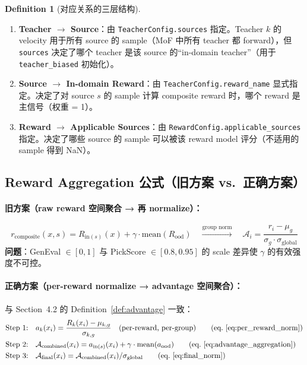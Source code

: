 \documentclass[11pt,a4paper]{article}
\theoremstyle{definition}
\newtheorem{definition}{Definition}
\begin{document}
\begin{definition}[对应关系的三层结构]
\begin{enumerate}[leftmargin=1.5em]
\item \textbf{Teacher $\to$ Source}：由 \texttt{TeacherConfig.sources} 指定。Teacher $k$ 的 velocity 用于所有 source 的 sample（MoF 中所有 teacher 都 forward），但 \texttt{sources} 决定了哪个 teacher 是该 source 的``in-domain teacher''（用于 \texttt{teacher\_biased} 初始化）。

\item \textbf{Source $\to$ In-domain Reward}：由 \texttt{TeacherConfig.reward\_name} 显式指定。决定了对 source $s$ 的 sample 计算 composite reward 时，哪个 reward 是主信号（权重 = 1）。

\item \textbf{Reward $\to$ Applicable Sources}：由 \texttt{RewardConfig.applicable\_sources} 指定。决定了哪些 source 的 sample 可以被该 reward model 评分（不适用的 sample 得到 NaN）。
\end{enumerate}
\end{definition}

\subsection{Reward Aggregation 公式（旧方案 vs.\ 正确方案）}

\paragraph{旧方案（raw reward 空间聚合 → 再 normalize）：}
\begin{equation}
r_{\mathrm{composite}}(x, s) = R_{\mathrm{in}(s)}(x) + \gamma \cdot \mathrm{mean}(R_{\mathrm{ood}})
\quad\xrightarrow{\text{group norm}}\quad
\mathcal{A}_i = \frac{r_i - \mu_g}{\sigma_g \cdot \sigma_{\mathrm{global}}}
\tag{旧}
\end{equation}
\textbf{问题}：GenEval $\in [0,1]$ 与 PickScore $\in [0.8, 0.95]$ 的 scale 差异使 $\gamma$ 的有效强度不可控。

\paragraph{正确方案（per-reward normalize → advantage 空间聚合）：}

与 Section~4.2 的 Definition~\ref{def:advantage} 一致：
\begin{align}
&\text{Step 1:}\quad a_k(x_i) = \frac{R_k(x_i) - \mu_{k,g}}{\sigma_{k,g}} \quad\text{(per-reward, per-group)} \tag{eq.~\ref{eq:per_reward_norm}} \\
&\text{Step 2:}\quad \mathcal{A}_{\mathrm{combined}}(x_i) = a_{\mathrm{in}(s)}(x_i) + \gamma \cdot \mathrm{mean}(a_{\mathrm{ood}}) \tag{eq.~\ref{eq:advantage_aggregation}} \\
&\text{Step 3:}\quad \mathcal{A}_{\mathrm{final}}(x_i) = \mathcal{A}_{\mathrm{combined}}(x_i) / \sigma_{\mathrm{global}} \tag{eq.~\ref{eq:final_norm}}
\end{align}
\end{document}
